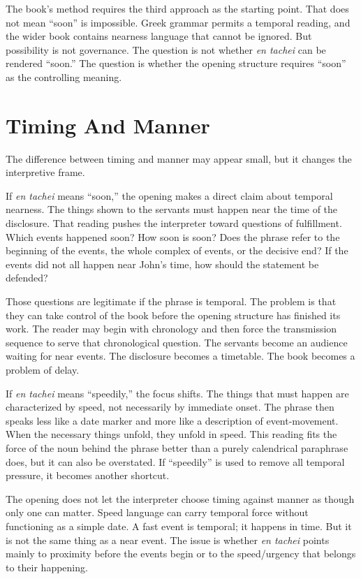 The book's method requires the third approach as the starting point. That does not mean ``soon'' is impossible. Greek grammar permits a temporal reading, and the wider book contains nearness language that cannot be ignored. But possibility is not governance. The question is not whether \textit{en tachei} can be rendered ``soon.'' The question is whether the opening structure requires ``soon'' as the controlling meaning.

\section{Timing And Manner}

The difference between timing and manner may appear small, but it changes the interpretive frame.

If \textit{en tachei} means ``soon,'' the opening makes a direct claim about temporal nearness. The things shown to the servants must happen near the time of the disclosure. That reading pushes the interpreter toward questions of fulfillment. Which events happened soon? How soon is soon? Does the phrase refer to the beginning of the events, the whole complex of events, or the decisive end? If the events did not all happen near John's time, how should the statement be defended?

Those questions are legitimate if the phrase is temporal. The problem is that they can take control of the book before the opening structure has finished its work. The reader may begin with chronology and then force the transmission sequence to serve that chronological question. The servants become an audience waiting for near events. The disclosure becomes a timetable. The book becomes a problem of delay.

If \textit{en tachei} means ``speedily,'' the focus shifts. The things that must happen are characterized by speed, not necessarily by immediate onset. The phrase then speaks less like a date marker and more like a description of event-movement. When the necessary things unfold, they unfold in speed. This reading fits the force of the noun behind the phrase better than a purely calendrical paraphrase does, but it can also be overstated. If ``speedily'' is used to remove all temporal pressure, it becomes another shortcut.

The opening does not let the interpreter choose timing against manner as though only one can matter. Speed language can carry temporal force without functioning as a simple date. A fast event is temporal; it happens in time. But it is not the same thing as a near event. The issue is whether \textit{en tachei} points mainly to proximity before the events begin or to the speed/urgency that belongs to their happening.

